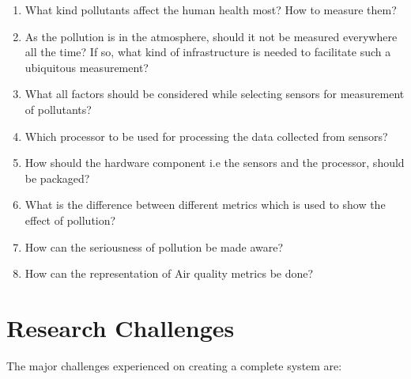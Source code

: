  \begin{enumerate}
 
  \item What kind pollutants affect the human health most? How to measure them?
   
  \item  As the pollution is in the atmosphere, should it not be measured everywhere all the time? If so, what kind of infrastructure is needed to facilitate such a ubiquitous measurement?
  
 \item What all factors should be considered while selecting sensors for measurement of pollutants?
 
 \item Which processor to be used for processing the data collected from sensors?
 
 \item How should the hardware component i.e the sensors and the processor, should be packaged?
 
 \item What is the difference between different metrics which is used to show       	the effect of pollution?

\item How can the seriousness of pollution be made aware?

 \item How can the representation of Air quality metrics be done?
 
 \end{enumerate}
 
\section{Research Challenges}


The major challenges experienced on creating a complete system are:

